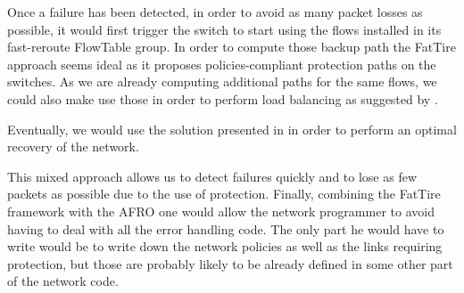 \documentclass[]{IEEEtran}
\begin{document}
Once a failure has been detected, in order to avoid as many packet losses as possible, it would first trigger the switch to start using the flows installed in its fast-reroute FlowTable group. In order to compute those backup path the FatTire approach seems ideal \cite{Reitblatt:2013:FDF:2491185.2491187} as it proposes policies-compliant protection paths on the switches. As we are already computing additional paths for the same flows, we could also make use those in order to perform load balancing as suggested by \cite{Suchara:2011:NAJ:1993744.1993756}.

Eventually, we would use the solution presented in \cite{Kuzniar:2013:AFR:2491185.2491218} in order to perform an optimal recovery of the network.

This mixed approach allows us to detect failures quickly and to lose as few packets as possible due to the use of protection. Finally, combining the FatTire framework with the AFRO one would allow the network programmer to avoid having to deal with all the error handling code. The only part he would have to write would be to write down the network policies as well as the links requiring protection, but those are probably likely to be already defined in some other part of the network code.
\pagebreak

\nocite{*}

\end{document}
